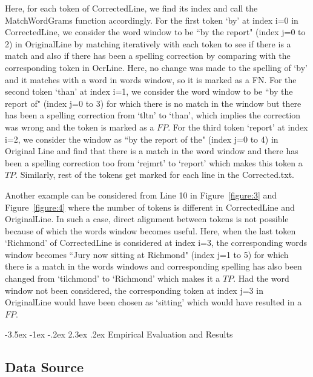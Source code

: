 \documentclass[12pt]{article}
\makeatletter
\renewcommand\section{\@startsection{section}{1}{\z@}%
                                  {-3.5ex \@plus -1ex \@minus -.2ex}%
                                  {2.3ex \@plus.2ex}%
                                  {\normalfont\bfseries}}
\makeatother
\begin{document}
Here, for each token of CorrectedLine, we find its index and call the MatchWordGrams function accordingly. For the first token `by' at index i=0 in CorrectedLine, we consider the word window to be ``by the report" (index j=0 to 2) in OriginalLine by matching iteratively with each token to see if there is a match and also if there has been a spelling correction by comparing with the corresponding token in OcrLine. Here, no change was made to the spelling of `by' and it matches with a word in words window, so it is marked as a FN. For the second token `than' at index i=1, we consider the word window to be ``by the report of" (index j=0 to 3) for which there is no match in the window but there has been a spelling correction from `tltn' to `than', which implies the correction was wrong and the token is marked as a $FP$. For the third token `report' at index i=2, we consider the window as ``by the report of the" (index j=0 to 4) in Original Line and find that there is a match in the word window and there has been a spelling correction too from `rejmrt' to `report' which makes this token a $TP$. Similarly, rest of the tokens get marked for each line in the Corrected.txt. 

Another example can be considered from Line 10 in Figure~\ref{figure:3} and Figure~\ref{figure:4} where the number of tokens is different in CorrectedLine and OriginalLine. In such a case, direct alignment between tokens is not possible because of which the words window becomes useful. Here, when the last token `Richmond' of CorrectedLine is considered at index i=3, the corresponding words window becomes ``Jury now sitting at Richmond" (index j=1 to 5) for which there is a match in the words windows and corresponding spelling has also been changed from `tilchmond' to `Richmond' which makes it a $TP$. Had the word window not been considered, the corresponding token at index j=3 in OriginalLine would have been chosen as `sitting' which would have resulted in a $FP$. 
   

\section{Empirical Evaluation and Results}



\subsection{Data Source} 
\end{document}
